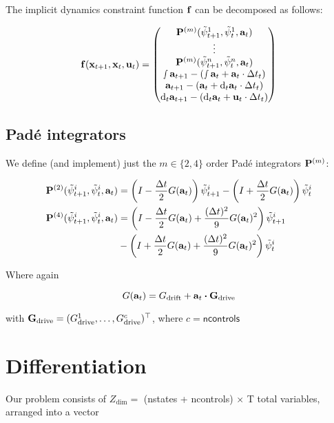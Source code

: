 \documentclass{article}
\newcommand{\isopsi}{\tilde \psi}
\begin{document}
The implicit dynamics constraint function $\vb{f}$ can be decomposed as follows:

$$
\vb{f}(\vb{x}_{t+1}, \vb{x}_t, \vb{u}_t) 
= \begin{pmatrix} 
  \vb{P}^{(m)} (\isopsi^1_{t+1}, \isopsi^1_t, \vb{a}_t) \\ 
  \vdots \\
  \vb{P}^{(m)} (\isopsi^n_{t+1}, \isopsi^n_t, \vb{a}_t) \\
  \smallint \vb{a}_{t+1} - \left(\smallint \vb{a}_t + \vb{a}_t \cdot \Delta t_t  \right) \\
  \vb{a}_{t+1} - \left(\vb{a}_t + \dd_t \vb{a}_t \cdot \Delta t_t  \right) \\
  \dd_t \vb{a}_{t+1} - \left(\dd_t \vb{a}_t + \vb{u}_t \cdot \Delta t_t \right)
  \end{pmatrix}
$$

\newpage
\subsection{Pad\'e integrators}

We define (and implement) just the $m \in \{2, 4\}$ order Pad\'e integrators $\vb{P}^{(m)}$:

\begin{align*}
  \vb{P}^{(2)}(\isopsi^i_{t+1}, \isopsi^i_t, \vb{a}_t) &= \left(I - \frac{\Delta t}{2} G(\vb{a}_t) \right) \isopsi^i_{t+1} -  \left(I + \frac{\Delta t}{2} G(\vb{a}_t) \right) \isopsi^i_{t}\\   
  \vb{P}^{(4)}(\isopsi^i_{t+1}, \isopsi^i_t, \vb{a}_t) &= \left(I - \frac{\Delta t}{2} G(\vb{a}_t) + \frac{(\Delta t)^2}{9} G(\vb{a}_t)^2\right) \isopsi^i_{t+1} \\ 
  &- \left(I + \frac{\Delta t}{2} G(\vb{a}_t) + \frac{(\Delta t)^2}{9} G(\vb{a}_t)^2\right) \isopsi^i_t 
\end{align*}

Where again 

$$
G(\vb{a}_t) = G_{\text{drift}} + \vb{a}_t \vdot \vb{G}_{\text{drive}}
$$

with $\vb{G}_{\text{drive}} = (G^1_{\text{drive}}, \dots, G^c_{\text{drive}})^\top$, where $c = \textsf{ncontrols}$

\newpage
\section{Differentiation}

Our problem consists of $Z_{\dim}=$ \textsf{(nstates + ncontrols) $\times$ T} total variables, arranged into a vector
\end{document}
